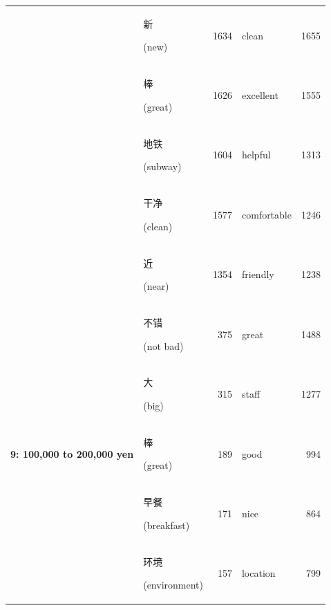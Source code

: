 \documentclass[smallextended,natbib]{svjour3}       %
\begin{document}
\begin{table}[ht]
{\begin{tabular}{|c|lr|lr|}
                                                             & \begin{CJK}{UTF8}{gbsn}新\end{CJK} (new)              & 1634  & clean       & 1655  \\  
                                                             & \begin{CJK}{UTF8}{gbsn}棒\end{CJK} (great)            & 1626  & excellent   & 1555  \\  
                                                             & \begin{CJK}{UTF8}{gbsn}地铁\end{CJK} (subway)          & 1604  & helpful     & 1313  \\  
                                                             & \begin{CJK}{UTF8}{gbsn}干净\end{CJK} (clean)           & 1577  & comfortable & 1246  \\  
                                                             & \begin{CJK}{UTF8}{gbsn}近\end{CJK} (near)             & 1354  & friendly    & 1238  \\ \hline
        \multirow{10}{*}{\textbf{9: 100,000 to 200,000 yen}} & \begin{CJK}{UTF8}{gbsn}不错\end{CJK} (not bad)         & 375   & great       & 1488  \\  
                                                             & \begin{CJK}{UTF8}{gbsn}大\end{CJK} (big)              & 315   & staff       & 1277  \\  
                                                             & \begin{CJK}{UTF8}{gbsn}棒\end{CJK} (great)            & 189   & good        & 994   \\  
                                                             & \begin{CJK}{UTF8}{gbsn}早餐\end{CJK} (breakfast)       & 171   & nice        & 864   \\  
                                                             & \begin{CJK}{UTF8}{gbsn}环境\end{CJK} (environment)    & 157   & location    & 799   \\  

\end{tabular}}
\end{table}
\end{document}
